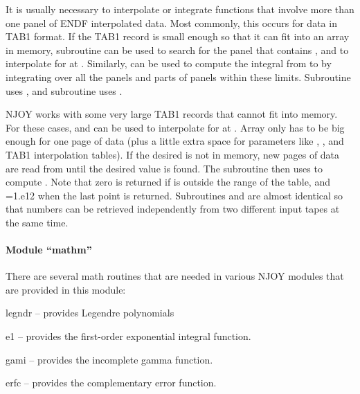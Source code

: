 It is usually necessary to interpolate or integrate functions that
involve more than one panel of ENDF interpolated data.  Most commonly,
this occurs for data in TAB1 format.  If the TAB1 record is small enough
so that it can fit into an array  in memory, subroutine
 can be used to search for the panel that contains
, and to interpolate for  at .  Similarly,
 can be used to compute the integral from  to
 by integrating over all the panels and parts of panels within
these limits.  Subroutine  uses , and
subroutine  uses .

NJOY works with some very large TAB1 records that cannot fit into
memory.  For these cases,  and  can be used
to interpolate for  at .  Array  only has
to be big enough for one page of data (plus a little extra space for
parameters like , , and TAB1 interpolation
tables).  If the desired  is not in memory, new pages of
data are read from  until the desired value is found.
The subroutine then uses  to compute .  Note
that zero is returned if  is outside the range of the table,
and =1.e12 when the last point is returned.  Subroutines
 and  are almost identical so that numbers
can be retrieved independently from two different input tapes at the
same time.

\paragraph{Module ``mathm''}

There are several math routines that are needed in various NJOY
modules that are provided in this module:

\begin{description}
\begin{singlespace}
\item[legndr --] provides Legendre polynomials

\item[e1 --] provides the first-order exponential integral function.

\item[gami --] provides the incomplete gamma function.

\item[erfc --] provides the complementary error function.
\end{singlespace}
\end{description}

